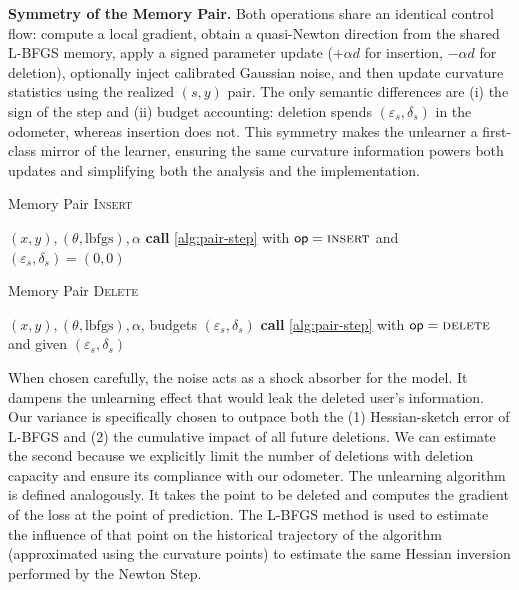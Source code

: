 \documentclass{article}
\theoremstyle{ssltheorem}
\begin{document}
\textbf{Symmetry of the Memory Pair.} Both operations share an identical control flow: compute a local gradient, obtain a quasi-Newton direction from the shared L-BFGS memory, apply a signed parameter update ($+\alpha d$ for insertion, $-\alpha d$ for deletion), optionally inject calibrated Gaussian noise, and then update curvature statistics using the realized $(s,y)$ pair.
The only semantic differences are (i) the sign of the step and (ii) budget accounting: deletion spends $(\varepsilon_s,\delta_s)$ in the odometer, whereas insertion does not.
This symmetry makes the unlearner a first-class mirror of the learner, ensuring the same curvature information powers both updates and simplifying both the analysis and the implementation.
\begin{algorithm}
\caption{Memory Pair \textsc{Insert}}
\label{alg:insertion-symmetric}
\begin{algorithmic}
\Require $(x,y),(\theta,\mathrm{lbfgs}),\alpha$
\State \textbf{call} \ref{alg:pair-step} with $\mathsf{op}=\textsc{insert}$ and $(\varepsilon_s,\delta_s)=(0,0)$
\end{algorithmic}
\end{algorithm}

\begin{algorithm}
\caption{Memory Pair \textsc{Delete}}
\label{alg:deletion-symmetric}
\begin{algorithmic}
\Require $(x,y),(\theta,\mathrm{lbfgs}),\alpha$, budgets $(\varepsilon_s,\delta_s)$
\State \textbf{call} \ref{alg:pair-step} with $\mathsf{op}=\textsc{delete}$ and given $(\varepsilon_s,\delta_s)$
\end{algorithmic}
\end{algorithm}

When chosen carefully, the noise acts as a shock absorber for the model.
It dampens the unlearning effect that would leak the deleted user's information.
Our variance is specifically chosen to outpace both the (1) Hessian-sketch error of L-BFGS and (2) the cumulative impact of all future deletions.
We can estimate the second because we explicitly limit the number of deletions with deletion capacity and ensure its compliance with our odometer.
The unlearning algorithm is defined analogously. It takes the point to be deleted and computes the gradient of the loss at the point of prediction.
The L-BFGS method is used to estimate the influence of that point on the historical trajectory of the algorithm (approximated using the curvature points) to estimate the same Hessian inversion performed by the Newton Step.
\end{document}
